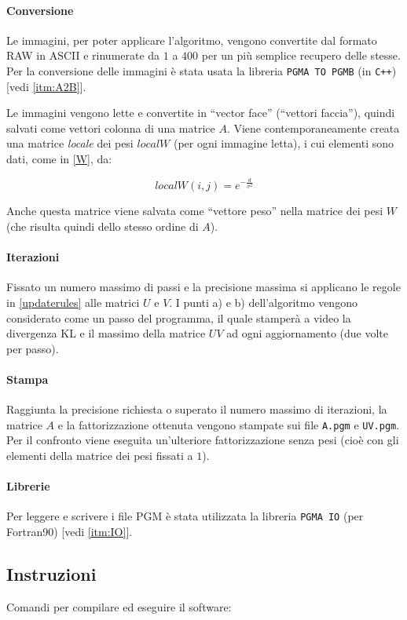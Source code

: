\documentclass[a4paper]{article} %
\begin{document}
\paragraph{Conversione}\label{paragr:conversione}
Le immagini, per poter applicare l'algoritmo, vengono convertite dal formato RAW in ASCII e rinumerate da $1$ a $400$ per un più semplice recupero delle stesse. Per la conversione delle immagini è stata usata la libreria \texttt{PGMA TO PGMB} (in \texttt{C++}) [vedi \ref{itm:A2B}].

Le immagini vengono lette e convertite in ``vector face'' (``vettori faccia''), quindi salvati come vettori colonna di una matrice $A$. Viene contemporaneamente creata una matrice \emph{locale} dei pesi $localW$ (per ogni immagine letta), i cui elementi sono dati, come in \ref{W}, da:

\[ localW(i,j) = e^{-\frac{d}{\sigma^2}} \]

Anche questa matrice viene salvata come ``vettore peso'' nella matrice dei pesi $W$ (che risulta quindi dello stesso ordine di $A$).

\paragraph{Iterazioni}
Fissato un numero massimo di passi e la precisione massima si applicano le regole in \ref{updaterules} alle matrici $U$ e $V$. I punti a) e b)  dell'algoritmo vengono considerato come un passo del programma, il quale stamperà a video la divergenza KL e il massimo della matrice $UV$ ad ogni aggiornamento (due volte per passo).

\paragraph{Stampa}
Raggiunta la precisione richiesta o superato il numero massimo di iterazioni, la matrice $A$ e la fattorizzazione ottenuta vengono stampate sui file \texttt{A.pgm} e \texttt{UV.pgm}.
Per il confronto viene eseguita un'ulteriore fattorizzazione senza pesi (cioè con gli elementi della matrice dei pesi fissati a $1$).

\paragraph{Librerie}
Per leggere e scrivere i file PGM è stata utilizzata la libreria \texttt{PGMA IO} (per Fortran90) [vedi \ref{itm:IO}].

\subsection{Instruzioni}
Comandi per compilare ed eseguire il software:
\end{document}
